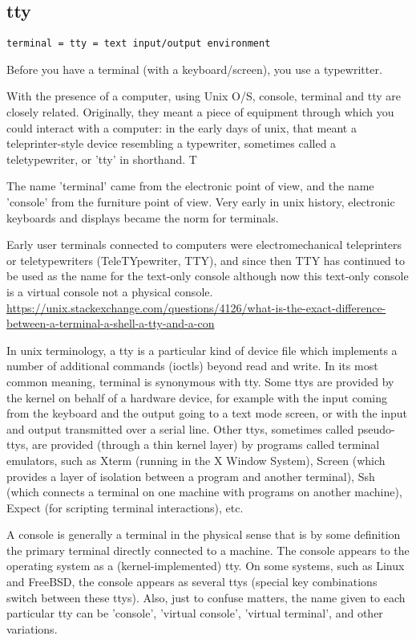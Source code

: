 \subsection{tty}
\label{sec:tty}

\begin{verbatim}
terminal = tty = text input/output environment
\end{verbatim}

Before you have a terminal (with a keyboard/screen), you use a typewritter.

With the presence of a computer, using Unix O/S, console, terminal and tty are
closely related. Originally, they meant a piece of equipment through which you
could interact with a computer: in the early days of unix, that meant a
teleprinter-style device resembling a typewriter, sometimes called a
teletypewriter, or 'tty' in shorthand. T

The name 'terminal' came from the electronic point of view, and the name
'console' from the furniture point of view. Very early in unix history,
electronic keyboards and displays became the norm for terminals.


Early user terminals connected to computers were electromechanical teleprinters
or teletypewriters (TeleTYpewriter, TTY), and since then TTY has continued to be
used as the name for the text-only console although now this text-only console
is a virtual console not a physical console.  
\url{https://unix.stackexchange.com/questions/4126/what-is-the-exact-difference-between-a-terminal-a-shell-a-tty-and-a-con}

In unix terminology, a tty is a particular kind of device file which implements
a number of additional commands (ioctls) beyond read and write. In its most
common meaning, terminal is synonymous with tty. Some ttys are provided by the
kernel on behalf of a hardware device, for example with the input coming from
the keyboard and the output going to a text mode screen, or with the input and
output transmitted over a serial line. Other ttys, sometimes called pseudo-ttys,
are provided (through a thin kernel layer) by programs called terminal
emulators, such as Xterm (running in the X Window System), Screen (which
provides a layer of isolation between a program and another terminal), Ssh
(which connects a terminal on one machine with programs on another machine),
Expect (for scripting terminal interactions), etc.


A console is generally a terminal in the physical sense that is by some
definition the primary terminal directly connected to a machine. The console
appears to the operating system as a (kernel-implemented) tty.   
 On some systems, such as Linux and FreeBSD, the console appears as several ttys
(special key combinations switch between these ttys). Also, 
 just to confuse matters, the name given to each particular tty can be
'console', 'virtual console', 'virtual terminal', and other variations.

